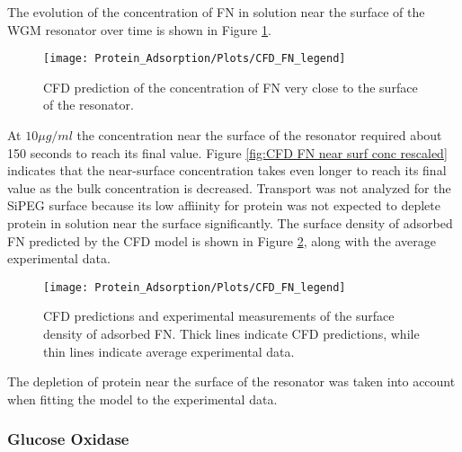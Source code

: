 The evolution of the concentration of FN in solution near the surface
of the WGM resonator over time is shown in Figure \ref{fig:CFD Bulk Conc}.%
\begin{figure}

\texttt{[image: Protein\_Adsorption/Plots/CFD\_FN\_legend]}\caption{\label{fig:CFD Bulk Conc}CFD prediction of the concentration of FN
very close to the surface of the resonator.}


%
\end{figure}
 At $10\mu g/ml$ the concentration near the surface of the resonator
required about 150 seconds to reach its final value. Figure \ref{fig:CFD FN near surf conc rescaled}
indicates that the near-surface concentration takes even longer to
reach its final value as the bulk concentration is decreased. Transport
was not analyzed for the SiPEG surface because its low affiinity for
protein was not expected to deplete protein in solution near the surface
significantly. The surface density of adsorbed FN predicted by the
CFD model is shown in Figure \ref{fig:CFD near surface conc}, along
with the average experimental data.%
\begin{figure}

\texttt{[image: Protein\_Adsorption/Plots/CFD\_FN\_legend]}

\caption{\label{fig:CFD near surface conc}CFD predictions and experimental
measurements of the surface density of adsorbed FN. Thick lines indicate
CFD predictions, while thin lines indicate average experimental data.}


%
\end{figure}
 The depletion of protein near the surface of the resonator was taken
into account when fitting the model to the experimental data.


\subsubsection{Glucose Oxidase}

